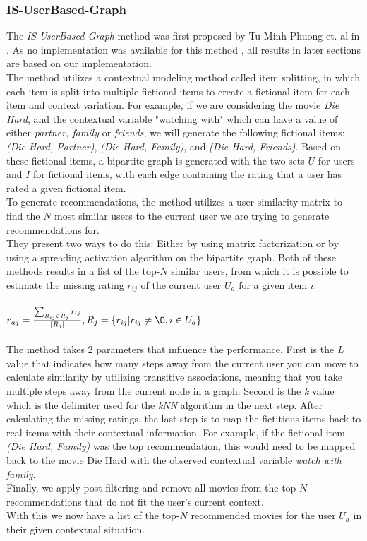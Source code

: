 \subsubsection{IS-UserBased-Graph}
The \textit{IS-UserBased-Graph} method was first proposed by Tu Minh Phuong et. al in \cite{GraphBasedCollaborativePaper}.
As no implementation was available for this method , all results in later sections are based on our implementation.\\
The method utilizes a contextual modeling method called item splitting, in which each item is split into multiple fictional items to create a fictional item for each item and context variation.
For example, if we are considering the movie \textit{Die Hard}, and the contextual variable "watching with" which can have a value of either \textit{partner, family} or \textit{friends}, we will generate the following fictional items: \textit{(Die Hard, Partner)}, \textit{(Die Hard, Family)}, and \textit{(Die Hard, Friends)}.
Based on these fictional items, a bipartite graph is generated with the two sets $U$ for users and $I$ for fictional items, with each edge containing the rating that a user has rated a given fictional item.\\
To generate recommendations, the method utilizes a user similarity matrix to find the $N$ most similar users to the current user we are trying to generate recommendations for.\\
They present two ways to do this: Either by using matrix factorization or by using a spreading activation algorithm on the bipartite graph.
Both of these methods results in a list of the top-$N$ similar users, from which it is possible to estimate the missing rating $r_{ij}$ of the current user $U_a$ for a given item $i$:
\\\\
$r_{aj} = \frac{\sum_{R_{ij} \in R_j} r_{ij}}{|R_j|}, R_j = \{ r_{ij} | r_{ij} \neq \O , i \in U_a \}$
\\\\
The method takes 2 parameters that influence the performance.
First is the \textit{L} value that indicates how many steps away from the current user you can move to calculate similarity by utilizing transitive associations, meaning that you take multiple steps away from the current node in a graph.
Second is the \textit{k} value which is the delimiter used for the \textit{kNN} algorithm in the next step.
After calculating the missing ratings, the last step is to map the fictitious items back to real items with their contextual information.
For example, if the fictional item \textit{(Die Hard, Family)} was the top recommendation, this would need to be mapped back to the movie Die Hard with the observed contextual variable \textit{watch with family}.\\
Finally, we apply post-filtering and remove all movies from the top-$N$ recommendations that do not fit the user's current context.\\
With this we now have a list of the top-$N$ recommended movies for the user $U_a$ in their given contextual situation.
